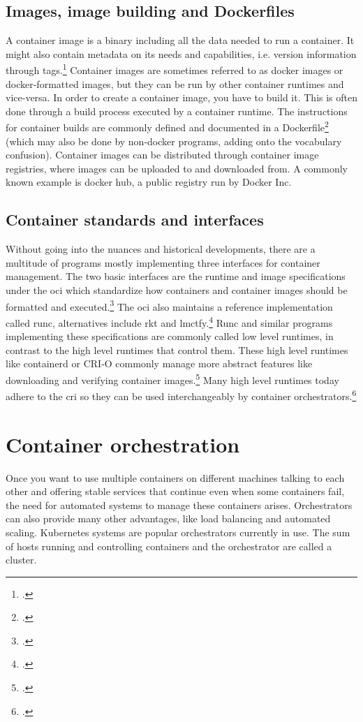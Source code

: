 \subsection{Images, image building and Dockerfiles}
A container image is a binary including all the data needed to run a container. It might also contain metadata on its needs and capabilities, i.e. version information through tags.\footcite{redhatImages}
Container images are sometimes referred to as docker images or docker-formatted images, but they can be run by other container runtimes and vice-versa.
In order to create a container image, you have to build it. This is often done through a build process executed by a container runtime. The instructions for container builds are commonly defined and documented in a Dockerfile\footcite{dockerfileDocs} (which may also be done by non-docker programs, adding onto the vocabulary confusion).
Container images can be distributed through container image registries, where images can be uploaded to and downloaded from. A commonly known example is docker hub, a public registry run by Docker Inc.

\subsection{Container standards and interfaces} \label{runtimes}

Without going into the nuances and historical developments, there are a multitude of programs mostly implementing three interfaces for container management.
The two basic interfaces are the runtime and image specifications under the \gls{oci} which standardize how containers and container images should be formatted and executed.\footcite{ociStandards}
The \gls{oci} also maintains a reference implementation called runc, alternatives include rkt and lmctfy.\footcite{lowLevelRuntimes}
Runc and similar programs implementing these specifications are commonly called low level runtimes, in contrast to the high level runtimes that control them.
These high level runtimes like containerd or CRI-O commonly manage more abstract features like downloading and verifying container images.\footcite{highLevelRuntimes}
Many high level runtimes today adhere to the \gls{cri} so they can be used interchangeably by container orchestrators.\footcite{criDocs}


\section{Container orchestration}
Once you want to use multiple containers on different machines talking to each other and offering stable services that continue even when some containers fail, the need for automated systems to manage these containers arises. Orchestrators can also provide many other advantages, like load balancing and automated scaling.
Kubernetes systems are popular orchestrators currently in use.
The sum of hosts running and controlling containers and the orchestrator are called a cluster.


